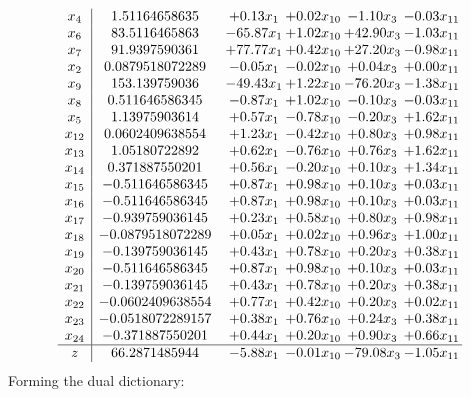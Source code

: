 \documentclass[8pt]{article}
\begin{document}
\[\begin{array}{c| c c@{\hskip 2pt} c@{\hskip 2pt} c@{\hskip 2pt} c@{\hskip 2pt} }
 x_{4}   &  1.51164658635 & +  0.13 x_{1} & +  0.02 x_{10} & -1.10 x_{3} & -0.03 x_{11}\\
 x_{6}   &  83.5116465863 & -65.87 x_{1} & +  1.02 x_{10} & + 42.90 x_{3} & -1.03 x_{11}\\
 x_{7}   &  91.9397590361 & + 77.77 x_{1} & +  0.42 x_{10} & + 27.20 x_{3} & -0.98 x_{11}\\
 x_{2}   &  0.0879518072289 & -0.05 x_{1} & -0.02 x_{10} & +  0.04 x_{3} & +  0.00 x_{11}\\
 x_{9}   &  153.139759036 & -49.43 x_{1} & +  1.22 x_{10} & -76.20 x_{3} & -1.38 x_{11}\\
 x_{8}   &  0.511646586345 & -0.87 x_{1} & +  1.02 x_{10} & -0.10 x_{3} & -0.03 x_{11}\\
 x_{5}   &  1.13975903614 & +  0.57 x_{1} & -0.78 x_{10} & -0.20 x_{3} & +  1.62 x_{11}\\
 x_{12}   &  0.0602409638554 & +  1.23 x_{1} & -0.42 x_{10} & +  0.80 x_{3} & +  0.98 x_{11}\\
 x_{13}   &  1.05180722892 & +  0.62 x_{1} & -0.76 x_{10} & +  0.76 x_{3} & +  1.62 x_{11}\\
 x_{14}   &  0.371887550201 & +  0.56 x_{1} & -0.20 x_{10} & +  0.10 x_{3} & +  1.34 x_{11}\\
 x_{15}   &  -0.511646586345 & +  0.87 x_{1} & +  0.98 x_{10} & +  0.10 x_{3} & +  0.03 x_{11}\\
 x_{16}   &  -0.511646586345 & +  0.87 x_{1} & +  0.98 x_{10} & +  0.10 x_{3} & +  0.03 x_{11}\\
 x_{17}   &  -0.939759036145 & +  0.23 x_{1} & +  0.58 x_{10} & +  0.80 x_{3} & +  0.98 x_{11}\\
 x_{18}   &  -0.0879518072289 & +  0.05 x_{1} & +  0.02 x_{10} & +  0.96 x_{3} & +  1.00 x_{11}\\
 x_{19}   &  -0.139759036145 & +  0.43 x_{1} & +  0.78 x_{10} & +  0.20 x_{3} & +  0.38 x_{11}\\
 x_{20}   &  -0.511646586345 & +  0.87 x_{1} & +  0.98 x_{10} & +  0.10 x_{3} & +  0.03 x_{11}\\
 x_{21}   &  -0.139759036145 & +  0.43 x_{1} & +  0.78 x_{10} & +  0.20 x_{3} & +  0.38 x_{11}\\
 x_{22}   &  -0.0602409638554 & +  0.77 x_{1} & +  0.42 x_{10} & +  0.20 x_{3} & +  0.02 x_{11}\\
 x_{23}   &  -0.0518072289157 & +  0.38 x_{1} & +  0.76 x_{10} & +  0.24 x_{3} & +  0.38 x_{11}\\
 x_{24}   &  -0.371887550201 & +  0.44 x_{1} & +  0.20 x_{10} & +  0.90 x_{3} & +  0.66 x_{11}\\
\hline
z    &  66.2871485944 & -5.88 x_{1} & -0.01 x_{10} & -79.08 x_{3} & -1.05 x_{11}\\
\end{array}\]
Forming the dual dictionary:
\end{document}
